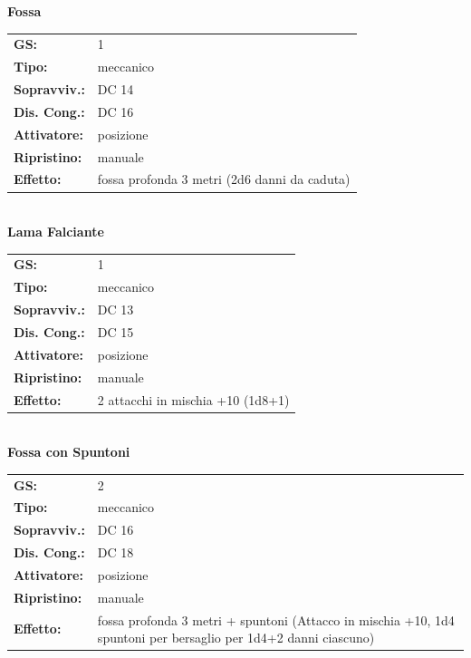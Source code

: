\begin{multicols}{2}
\textbf{Fossa}

\begin{tabularx}{0.48\textwidth}{lX}
	\textbf{GS:} & 1 \\
	\textbf{Tipo:} & meccanico \\
	\textbf{Sopravviv.:} & DC 14 \\
	\textbf{Dis. Cong.:} & DC 16 \\
	\textbf{Attivatore:} & posizione \\
	\textbf{Ripristino:} & manuale \\
	\textbf{Effetto:} & fossa profonda 3 metri (2d6 danni da caduta)
\end{tabularx}\\



\textbf{Lama Falciante}

\begin{tabularx}{0.48\textwidth}{lX}
	\textbf{GS:} & 1 \\
	\textbf{Tipo:} & meccanico \\
	\textbf{Sopravviv.:} & DC 13 \\
	\textbf{Dis. Cong.:} & DC 15 \\
	\textbf{Attivatore:} & posizione \\
	\textbf{Ripristino:} & manuale \\
	\textbf{Effetto:} & 2 attacchi in mischia +10 (1d8+1)
\end{tabularx}\\

\textbf{Fossa con Spuntoni}

\begin{tabularx}{0.48\textwidth}{lX}
	\textbf{GS:} & 2 \\
	\textbf{Tipo:} & meccanico \\
	\textbf{Sopravviv.:} & DC 16 \\
	\textbf{Dis. Cong.:} & DC 18 \\
	\textbf{Attivatore:} & posizione \\
	\textbf{Ripristino:} & manuale \\
	\textbf{Effetto:} & fossa profonda 3 metri + spuntoni (Attacco in mischia +10, 1d4 spuntoni per bersaglio per 1d4+2 danni ciascuno)
\end{tabularx}\\


\end{multicols}
